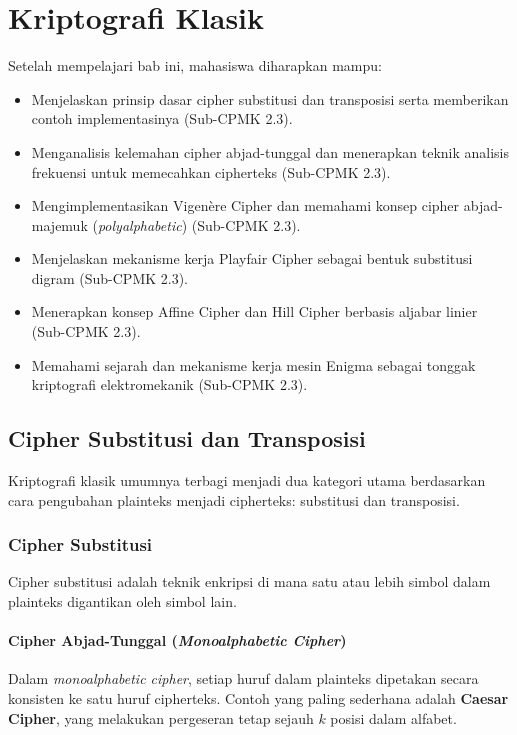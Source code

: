 \documentclass[../main.tex]{subfiles}
\begin{document}
\chapter{Kriptografi Klasik}

\begin{learningoutcome}
Setelah mempelajari bab ini, mahasiswa diharapkan mampu:
\begin{itemize}
    \item Menjelaskan prinsip dasar cipher substitusi dan transposisi serta memberikan contoh implementasinya (Sub-CPMK 2.3).
    \item Menganalisis kelemahan cipher abjad-tunggal dan menerapkan teknik analisis frekuensi untuk memecahkan cipherteks (Sub-CPMK 2.3).
    \item Mengimplementasikan Vigen\`ere Cipher dan memahami konsep cipher abjad-majemuk (\textit{polyalphabetic}) (Sub-CPMK 2.3).
    \item Menjelaskan mekanisme kerja Playfair Cipher sebagai bentuk substitusi digram (Sub-CPMK 2.3).
    \item Menerapkan konsep Affine Cipher dan Hill Cipher berbasis aljabar linier (Sub-CPMK 2.3).
    \item Memahami sejarah dan mekanisme kerja mesin Enigma sebagai tonggak kriptografi elektromekanik (Sub-CPMK 2.3).
\end{itemize}
\end{learningoutcome}

\section{Cipher Substitusi dan Transposisi}
Kriptografi klasik umumnya terbagi menjadi dua kategori utama berdasarkan cara pengubahan plainteks menjadi cipherteks: substitusi dan transposisi.

\subsection{Cipher Substitusi}
Cipher substitusi adalah teknik enkripsi di mana satu atau lebih simbol dalam plainteks digantikan oleh simbol lain.

\subsubsection{Cipher Abjad-Tunggal (\textit{Monoalphabetic Cipher})}
Dalam \textit{monoalphabetic cipher}, setiap huruf dalam plainteks dipetakan secara konsisten ke satu huruf cipherteks. Contoh yang paling sederhana adalah \textbf{Caesar Cipher}, yang melakukan pergeseran tetap sejauh $k$ posisi dalam alfabet.
\end{document}
